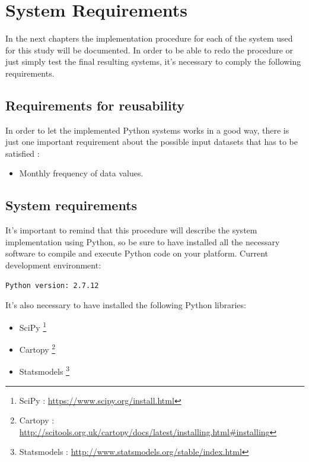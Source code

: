 




\label{Design_Requirements}
\section{System Requirements}
In the next chapters the implementation procedure for each of the system used for this study will be documented. In order to be able to redo the procedure or just simply test the final resulting systems, it's necessary to comply the following requirements. 
\vspace{-5mm}
\subsection{Requirements for reusability}
\vspace{-5mm}
In order to let the implemented Python systems works in a good way, there is just one important requirement about the possible input datasets that has to be satisfied :
\vspace{-5mm}
\begin{itemize}
\item Monthly frequency of data values.
\end{itemize}
\vspace{-5mm}
\subsection{System requirements}
\vspace{-5mm}
It's important to remind that this procedure will describe the system implementation using Python, so be sure to have installed all the necessary software to compile and execute Python code on your platform. Current development environment:
\begin{lstlisting}
Python version: 2.7.12
\end{lstlisting}

It's also necessary to have installed the following Python libraries:
\vspace{-5mm}
\begin{itemize}
\setlength{\itemsep}{-5pt}
\item  SciPy \footnote{SciPy : \url{https://www.scipy.org/install.html}}
\item Cartopy \footnote{Cartopy : \url{http://scitools.org.uk/cartopy/docs/latest/installing.html\#installing}}
\item Statsmodels \footnote{Statsmodels : \url{http://www.statsmodels.org/stable/index.html}}
\end{itemize}
\vspace{+5mm}



